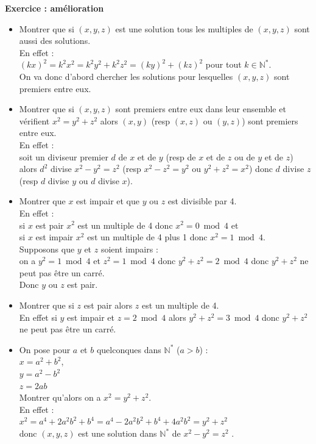 \documentclass[a4paper,11pt]{book}
\newcommand{\N}{{\mathbb{N}}}
\begin{document}
{\bf Exercice : am\'elioration}
\begin{itemize}
\item Montrer que si $(x,y,z)$ est une solution tous les multiples de $(x,y,z)$
sont aussi des solutions.\\
 En effet :\\
 $(kx)^2=k^2x^2=k^2y^2+k^2z^2=(ky)^2+(kz)^2$ pour tout $k \in \N^*$.\\
On va donc d'abord chercher les solutions pour lesquelles $(x,y,z)$ sont 
premiers entre eux. 
\item Montrer que si $(x,y,z)$ sont  premiers entre eux dans leur ensemble et 
v\'erifient $x^2=y^2+z^2$ alors  $(x,y)$ (resp $(x,z)$ ou $(y,z)$) sont 
premiers entre eux.\\
En effet :\\
soit un diviseur premier $d$ de 
$x$ et de $y$ (resp de $x$ et de $z$ ou de $y$ et de $z$) alors $d^2$ divise 
$x^2-y^2=z^2$ (resp $x^2-z^2=y^2$ ou $y^2+z^2=x^2$) donc $d$ divise $z$ (resp
$d$ divise $y$ ou $d$ divise $x$).
\item Montrer que $x$ est impair et que $y$ ou $z$ est divisible par 4.\\
En effet :\\
si $x$ est pair $x^2$ est un multiple de 4 donc $x^2=0 \bmod 4$ et\\
si $x$ est impair $x^2$ est un multiple de 4 plus 1 donc $x^2=1 \bmod 4$.\\
Supposons que $y$ et $z$ soient impairs :\\
on a  $y^2=1 \bmod 4$ et $z^2=1 \bmod 4$ donc $y^2+z^2=2 \bmod 4$
donc $y^2+z^2$ ne peut pas \^etre un carr\'e.\\
Donc $y$ ou $z$ est pair.
\item Montrer que  si $z$ est pair alors $z$ est un multiple de 4.\\
En effet si $y$ est impair et $z=2 \bmod 4$ alors $y^2+z^2=3 \bmod 4$ donc 
$y^2+z^2$ ne peut pas \^etre un carr\'e.
\item On pose  pour $a$ et $b$ quelconques dans $\N^*$ ($a>b$) :\\
$x=a^2+b^2$,\\
$y=a^2-b^2$\\
$z=2ab$\\
Montrer qu'alors on a $x^2=y^2+z^2$.\\
En effet :\\
$x^2=a^4+2a^2b^2+b^4=a^4-2a^2b^2+b^4+4a^2b^2=y^2+z^2$\\
donc $(x,y,z)$ est une solution dans $\N^*$ de $x^2-y^2=z^2$ .

\end{itemize}
\end{document}
